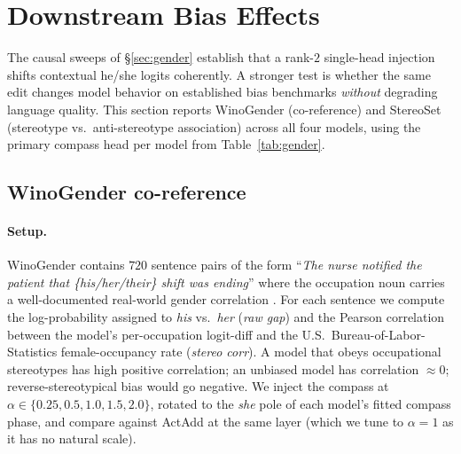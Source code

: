 \section{Downstream Bias Effects}
\label{sec:downstream}

The causal sweeps of \S\ref{sec:gender} establish that a rank-$2$
single-head injection shifts contextual he/she logits coherently.
A stronger test is whether the same edit changes model behavior on
established bias benchmarks \emph{without} degrading language
quality. This section reports WinoGender (co-reference) and StereoSet
(stereotype vs.\ anti-stereotype association) across all four models,
using the primary compass head per model from
Table~\ref{tab:gender}.

\subsection{WinoGender co-reference}
\label{sec:winogender}

\paragraph{Setup.} WinoGender contains $720$ sentence pairs of the form
``\emph{The nurse notified the patient that \{his/her/their\} shift was
ending}'' where the occupation noun carries a well-documented real-world
gender correlation \citep{rudinger2018winogender}. For each sentence we
compute the log-probability assigned to \emph{his} vs.\ \emph{her}
(\emph{raw gap}) and the Pearson correlation between the model's
per-occupation logit-diff and the
U.S.\ Bureau-of-Labor-Statistics female-occupancy rate
\citep{zhao2018winogender} (\emph{stereo corr}). A model that obeys
occupational stereotypes has high positive correlation; an unbiased
model has correlation $\approx 0$; reverse-stereotypical bias would go
negative. We inject the compass at $\alpha \in \{0.25, 0.5, 1.0, 1.5, 2.0\}$,
rotated to the \emph{she} pole of each model's fitted compass phase,
and compare against ActAdd \citep{turner2023actadd} at the same layer
(which we tune to $\alpha=1$ as it has no natural scale).

